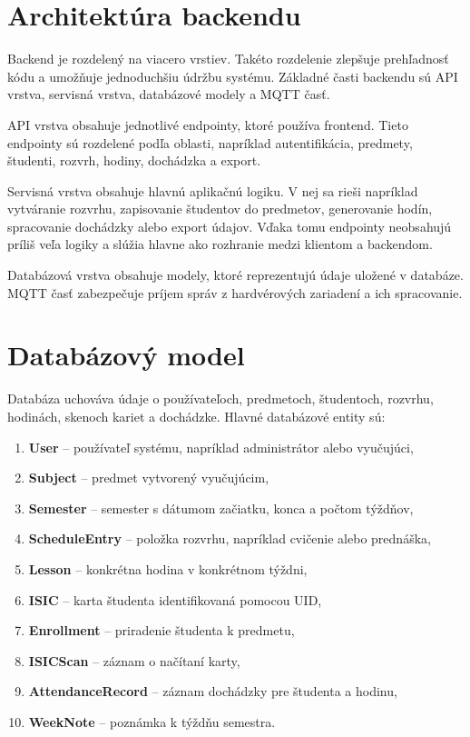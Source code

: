 \section{Architektúra backendu}
\label{sec:backend-architecture}

Backend je rozdelený na viacero vrstiev. Takéto rozdelenie zlepšuje prehľadnosť kódu a umožňuje jednoduchšiu údržbu systému. Základné časti backendu sú API vrstva, servisná vrstva, databázové modely a MQTT časť.

API vrstva obsahuje jednotlivé endpointy, ktoré používa frontend. Tieto endpointy sú rozdelené podľa oblasti, napríklad autentifikácia, predmety, študenti, rozvrh, hodiny, dochádzka a export.

Servisná vrstva obsahuje hlavnú aplikačnú logiku. V nej sa rieši napríklad vytváranie rozvrhu, zapisovanie študentov do predmetov, generovanie hodín, spracovanie dochádzky alebo export údajov. Vďaka tomu endpointy neobsahujú príliš veľa logiky a slúžia hlavne ako rozhranie medzi klientom a backendom.

Databázová vrstva obsahuje modely, ktoré reprezentujú údaje uložené v databáze. MQTT časť zabezpečuje príjem správ z hardvérových zariadení a ich spracovanie.

\section{Databázový model}
\label{sec:backend-database-model}

Databáza uchováva údaje o používateľoch, predmetoch, študentoch, rozvrhu, hodinách, skenoch kariet a dochádzke. Hlavné databázové entity sú:
\begin{enumerate}
    \item \textbf{User} -- používateľ systému, napríklad administrátor alebo vyučujúci,
    \item \textbf{Subject} -- predmet vytvorený vyučujúcim,
    \item \textbf{Semester} -- semester s dátumom začiatku, konca a počtom týždňov,
    \item \textbf{ScheduleEntry} -- položka rozvrhu, napríklad cvičenie alebo prednáška,
    \item \textbf{Lesson} -- konkrétna hodina v konkrétnom týždni,
    \item \textbf{ISIC} -- karta študenta identifikovaná pomocou UID,
    \item \textbf{Enrollment} -- priradenie študenta k predmetu,
    \item \textbf{ISICScan} -- záznam o načítaní karty,
    \item \textbf{AttendanceRecord} -- záznam dochádzky pre študenta a hodinu,
    \item \textbf{WeekNote} -- poznámka k týždňu semestra.
\end{enumerate}


